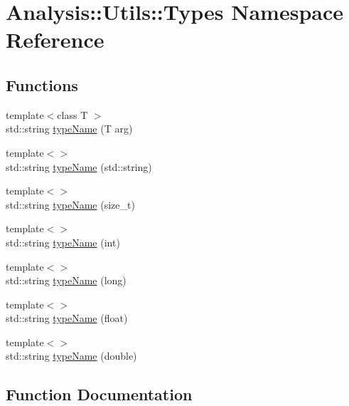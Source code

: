 \hypertarget{namespaceAnalysis_1_1Utils_1_1Types}{}\section{Analysis\+:\+:Utils\+:\+:Types Namespace Reference}
\label{namespaceAnalysis_1_1Utils_1_1Types}
\subsection*{Functions}
\begin{DoxyCompactItemize}
\item 
{\footnotesize template$<$class T $>$ }\\std\+::string \hyperlink{namespaceAnalysis_1_1Utils_1_1Types_aa5e7a61eebd6443d0c245a0df3ed301e}{type\+Name} (T arg)
\item 
{\footnotesize template$<$$>$ }\\std\+::string \hyperlink{namespaceAnalysis_1_1Utils_1_1Types_adebb24900d27e8699c823f173852d71f}{type\+Name} (std\+::string)
\item 
{\footnotesize template$<$$>$ }\\std\+::string \hyperlink{namespaceAnalysis_1_1Utils_1_1Types_a83ceec27b4a4e91a4dc50c874f8f0d99}{type\+Name} (size\+\_\+t)
\item 
{\footnotesize template$<$$>$ }\\std\+::string \hyperlink{namespaceAnalysis_1_1Utils_1_1Types_af6bfb00ebba0bcd8d973764f67896c2e}{type\+Name} (int)
\item 
{\footnotesize template$<$$>$ }\\std\+::string \hyperlink{namespaceAnalysis_1_1Utils_1_1Types_a57ebc9b06d2e6a29fdbd635440c99dab}{type\+Name} (long)
\item 
{\footnotesize template$<$$>$ }\\std\+::string \hyperlink{namespaceAnalysis_1_1Utils_1_1Types_a9cdf83d750cb3af673e1df1215373dbe}{type\+Name} (float)
\item 
{\footnotesize template$<$$>$ }\\std\+::string \hyperlink{namespaceAnalysis_1_1Utils_1_1Types_a916399950116452e07f81b9ef00cb07c}{type\+Name} (double)
\end{DoxyCompactItemize}


\subsection{Function Documentation}
